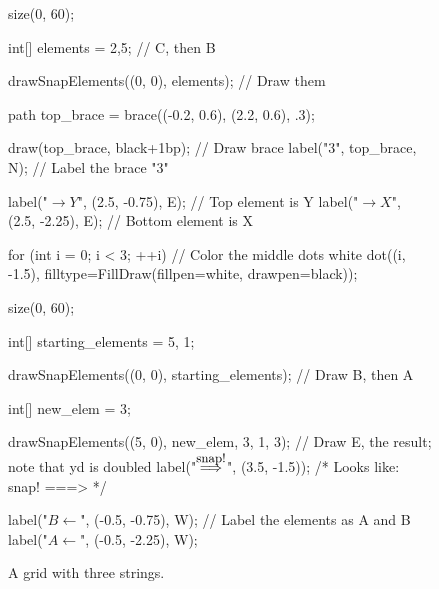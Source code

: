 \documentclass[../gatm.tex]{subfiles}
\begin{document}
\begin{figure}[h]
	\begin{minipage}{.5\textwidth}
		\begin{center}
			\begin{asy}
				size(0, 60);

				int[] elements = {2,5}; // C, then B

				drawSnapElements((0, 0), elements); // Draw them

				path top_brace = brace((-0.2, 0.6), (2.2, 0.6), .3);

				draw(top_brace, black+1bp); // Draw brace
				label("$3$", top_brace, N); // Label the brace "3"

				label("$\rightarrow Y$", (2.5, -0.75), E); // Top element is Y
				label("$\rightarrow X$", (2.5, -2.25), E); // Bottom element is X

				for (int i = 0; i < 3; ++i) // Color the middle dots white
					dot((i, -1.5), filltype=FillDraw(fillpen=white, drawpen=black));
			\end{asy}

			\caption{A grid with three strings.}
			\label{fig:n_rows_3_cols_ex}
		\end{center}
	\end{minipage}%
	\begin{minipage}{.5\textwidth}
		\begin{center}
			\begin{asy}
				size(0, 60);

				int[] starting_elements = {5, 1};

				drawSnapElements((0, 0), starting_elements); // Draw B, then A

				int[] new_elem = {3};

				drawSnapElements((5, 0), new_elem, 3, 1, 3); // Draw E, the result; note that yd is doubled
				label("$\stackrel{\mbox{\small snap!}}{\Longrightarrow}$", (3.5, -1.5));
				/* Looks like:
				snap!
				===>  */

				label("$B \leftarrow$", (-0.5, -0.75), W); // Label the elements as A and B
				label("$A \leftarrow$", (-0.5, -2.25), W);


\end{asy}
\end{center}
\end{minipage}
\end{figure}
\end{document}
